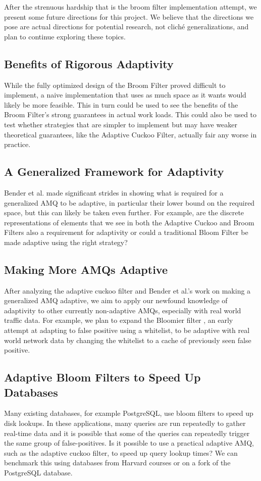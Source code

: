 \documentclass[../paper.tex]{subfiles}
\begin{document}
After the strenuous hardship that is the broom filter implementation attempt,
we present some future directions for this project. We believe that the directions
we pose are actual directions for potential research, not clich\'e generalizations,
and plan to continue exploring these topics.

\subsection{Benefits of Rigorous Adaptivity}
While the fully optimized design of the Broom Filter proved difficult to implement,
a naive implementation that uses as much space as it wants would likely be 
more feasible.  This in turn could be used to see the benefits of the Broom Filter's
strong guarantees in actual work loads.  This could also be used to test whether 
strategies that are simpler to implement but may have weaker theoretical 
guarantees, like the Adaptive Cuckoo Filter, actually fair any worse in practice.  

\subsection{A Generalized Framework for Adaptivity}
Bender et al. \cite{broom-filter} made significant strides in showing what is required
for a generalized AMQ to be adaptive, in particular their lower bound on the required 
space, but this can likely be taken even further.  For example, are the discrete 
representations of elements that we see in both the Adaptive Cuckoo and Broom 
Filters also a requirement for adaptivity or could a traditional Bloom Filter  be made 
adaptive using the right strategy?

\subsection{Making More AMQs Adaptive}
After analyzing the adaptive cuckoo filter \cite{adaptive-cuckoo} and Bender et al.'s work on
making a generalized AMQ adaptive, we aim to apply our newfound knowledge of adaptivity to other
currently non-adaptive AMQs, especially with real world traffic data. For example, we plan to
expand the Bloomier filter \cite{bloomier-filter}, an early attempt at adapting to false positive
using a whitelist, to be adaptive with real world network data by changing the whitelist to a
cache of previously seen false positive.

\subsection{Adaptive Bloom Filters to Speed Up Databases}
Many existing databases, for example PostgreSQL, use bloom filters to speed up disk lookups. In these
applications, many queries are run repeatedly to gather real-time data and it is possible that
some of the queries can repeatedly trigger the same group of false-positives. Is it possible to use
a practical adaptive AMQ, such as the adaptive cuckoo filter, to speed up query lookup times? We can
benchmark this using databases from Harvard courses or on a fork of the PostgreSQL database.
\end{document}
